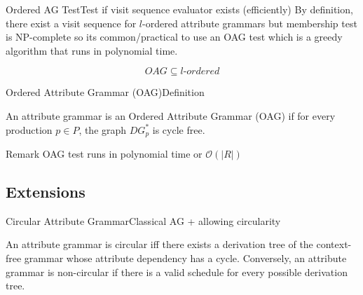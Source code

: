 \begin{frame}{Ordered AG Test}{Test if visit sequence evaluator exists (efficiently)}
By definition, there exist a visit sequence for \alert{$l$-ordered} attribute grammars but membership test is \alert{NP-complete} \cite{ENGELFRIET1982283} so its common/practical to use an OAG test which is a greedy algorithm that runs in \alert{polynomial time}.

\[ \mathit{OAG} \subseteq \mathit{l\text{-ordered}} \]

\end{frame}




\begin{frame}{Ordered Attribute Grammar (OAG)}{Definition}

\begin{definition}
An attribute grammar is an Ordered Attribute Grammar (OAG) if for every production $p \in P$, the graph $\mathit{DG}_p^*$ is \alert{cycle free}.
\end{definition}

\begin{block}{Remark}
OAG test runs in polynomial time or $\mathcal{O}(|R|)$
\end{block}

\end{frame}




\subsection*{Extensions}

\begin{frame}{Circular Attribute Grammar}{Classical AG + allowing circularity}
\begin{definition}
An attribute grammar is \alert{circular} iff there exists a derivation tree of the context-free grammar whose \alert{attribute dependency has a cycle}. Conversely, an attribute grammar is non-circular if there is a valid schedule for every possible derivation tree.
\end{definition}
\end{frame}

